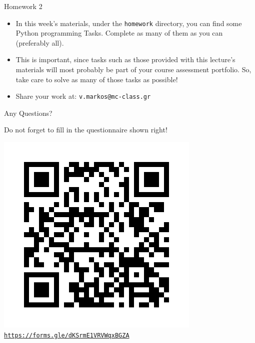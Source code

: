 \documentclass[aspectratio=169, 12pt, xcolor=table]{beamer}
\newcommand{\ohref}[1]{\href{#1}{\texttt{#1}}}
\begin{document}
	\begin{frame}{Homework 2}
		\begin{itemize}
			\item In this week's materials, under the \texttt{homework} directory, you can find some Python programming Tasks. Complete as many of them as you can (preferably all).
			\item This is important, since tasks such as those provided with this lecture's materials will most probably be part of your course assessment portfolio. So, take care to solve as many of those tasks as possible!
			\item Share your work at: \texttt{v.markos@mc-class.gr}
		\end{itemize}
	\end{frame}

	\begin{frame}{Any Questions?}
		\begin{minipage}{0.35\textwidth}
			\raggedright
			Do not forget to fill in the questionnaire shown right!
		\end{minipage}\hfill
		\begin{minipage}{0.58\textwidth}
			\vspace{0pt}
			\raggedleft
			\includegraphics[scale=0.4]{../../assets/post_lesson_assessment.png}
			\centering
			\ohref{https://forms.gle/dKSrmE1VRVWqxBGZA}
		\end{minipage}
	\end{frame}
	
\end{document}
